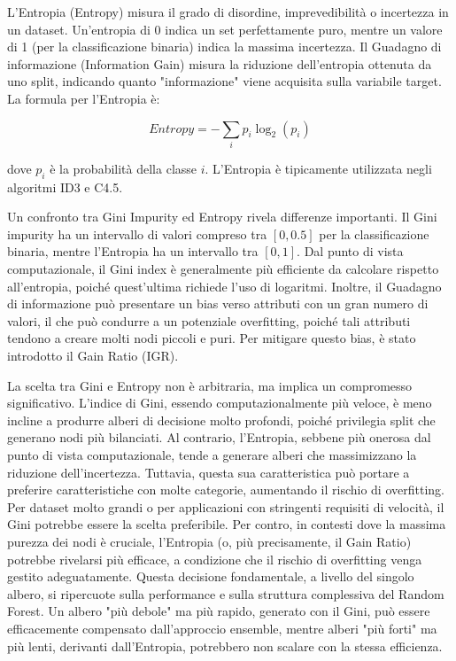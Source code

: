 \documentclass[a4paper,12pt]{report}
\begin{document}
	L'Entropia (Entropy) misura il grado di disordine, imprevedibilità o incertezza in un dataset. Un'entropia di 0 indica un set perfettamente puro, mentre un valore di 1 (per la classificazione binaria) indica la massima incertezza. Il Guadagno di informazione (Information Gain) misura la riduzione dell'entropia ottenuta da uno split, indicando quanto "informazione" viene acquisita sulla variabile target. La formula per l'Entropia è:
	
	$$Entropy = - \sum_{i} p_i \log_2(p_i)$$
	
	dove $p_i$ è la probabilità della classe $i$. L'Entropia è tipicamente utilizzata negli algoritmi ID3 e C4.5.
	
	Un confronto tra Gini Impurity ed Entropy rivela differenze importanti. Il Gini impurity ha un intervallo di valori compreso tra $[0, 0.5]$ per la classificazione binaria, mentre l'Entropia ha un intervallo tra $[0, 1]$. Dal punto di vista computazionale, il Gini index è generalmente più efficiente da calcolare rispetto all'entropia, poiché quest'ultima richiede l'uso di logaritmi. Inoltre, il Guadagno di informazione può presentare un bias verso attributi con un gran numero di valori, il che può condurre a un potenziale overfitting, poiché tali attributi tendono a creare molti nodi piccoli e puri. Per mitigare questo bias, è stato introdotto il Gain Ratio (IGR).
	
	La scelta tra Gini e Entropy non è arbitraria, ma implica un compromesso significativo. L'indice di Gini, essendo computazionalmente più veloce, è meno incline a produrre alberi di decisione molto profondi, poiché privilegia split che generano nodi più bilanciati. Al contrario, l'Entropia, sebbene più onerosa dal punto di vista computazionale, tende a generare alberi che massimizzano la riduzione dell'incertezza. Tuttavia, questa sua caratteristica può portare a preferire caratteristiche con molte categorie, aumentando il rischio di overfitting. Per dataset molto grandi o per applicazioni con stringenti requisiti di velocità, il Gini potrebbe essere la scelta preferibile. Per contro, in contesti dove la massima purezza dei nodi è cruciale, l'Entropia (o, più precisamente, il Gain Ratio) potrebbe rivelarsi più efficace, a condizione che il rischio di overfitting venga gestito adeguatamente. Questa decisione fondamentale, a livello del singolo albero, si ripercuote sulla performance e sulla struttura complessiva del Random Forest. Un albero "più debole" ma più rapido, generato con il Gini, può essere efficacemente compensato dall'approccio ensemble, mentre alberi "più forti" ma più lenti, derivanti dall'Entropia, potrebbero non scalare con la stessa efficienza.
	
\end{document}
